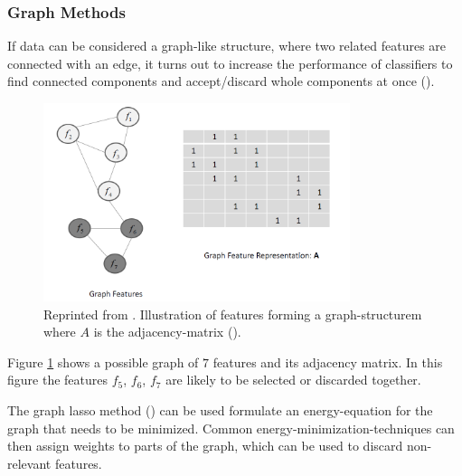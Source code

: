 \subsubsection{Graph Methods}
\label{sec:methods.structured.graph}


If data can be considered a graph-like structure, where two related features are
connected with an edge, it turns out to increase the performance of classifiers
to find connected components and accept/discard whole components at once
(\cite{Jacob:09}). 

\begin{figure}[!ht]
  \centering 
  \includegraphics[width=0.8\textwidth]{chapters/methods/structured/graph_lasso}
  \caption{Reprinted from \cite{Tang:14}. Illustration of features forming a
  graph-structurem where $A$ is the adjacency-matrix (\cite{Tang:14}).}
  \label{fig:methods.structured.graph.lasso}
\end{figure}

Figure \ref{fig:methods.structured.graph.lasso} shows a
possible graph of $7$ features and its adjacency matrix. In this figure the
features $f_5$, $f_6$, $f_7$ are likely to be selected or discarded together.

The graph lasso method (\cite{Jacob:09}) can be used formulate an
energy-equation for the graph that needs to be minimized. Common
energy-minimization-techniques can then assign weights to parts of the graph,
which can be used to discard non-relevant features.
